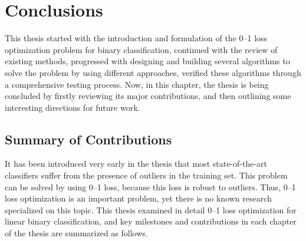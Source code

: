 \section{Conclusions}
\label{cha:conclusions}

This thesis started with the introduction and formulation of the 0--1 loss optimization problem for binary classification, continued with the review of existing methods, progressed with designing and building several algorithms to solve the problem by using different approaches, verified these algorithms through a comprehensive testing process. Now, in this chapter, the thesis is being concluded by firstly reviewing its major contributions, and then outlining some interesting directions for future work.

\subsection{Summary of Contributions}
\label{sec:concl.summary}

It has been introduced very early in the thesis that most state-of-the-art classifiers suffer from the presence of outliers in the training set. This problem can be solved by using 0--1 loss, because this loss is robust to outliers. Thus, 0--1 loss optimization is an important problem, yet there is no known research specialized on this topic. This thesis examined in detail 0--1 loss optimization for linear binary classification, and key milestones and contributions in each chapter of the thesis are summarized as follows. 

